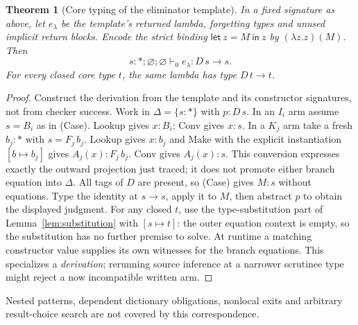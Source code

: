 \documentclass[11pt]{article}
\newtheorem{theorem}{Theorem}[section]
\theoremstyle{definition}
\newcommand{\arr}{\mathbin{\to}}
\begin{document}
\begin{theorem}[Core typing of the eliminator template]\label{thm:elim}
In a fixed signature as above, let $e_\lambda$ be the template's returned
lambda, forgetting types and unused implicit return blocks. Encode the
strict binding $\mathsf{let}\ z=M\ \mathsf{in}\ z$ by $(\lambda z.z)(M)$.
Then
\[
  s:*;\varnothing;\varnothing\vdash_0 e_\lambda:D\,s\arr s.
\]
For every closed core type $t$, the same lambda has type $D\,t\arr t$.
\end{theorem}
\begin{proof}
Construct the derivation from the template and its constructor signatures,
not from checker success. Work in $\Delta=\{s:*\}$ with $p:D\,s$. In an
$I_i$ arm assume $s=B_i$ as in (Case). Lookup gives $x:B_i$; \textsf{Conv}
gives $x:s$. In a $K_j$ arm take a fresh $b_j:*$ with $s=F_j\,b_j$.
Lookup gives $x:b_j$ and \textsf{Make} with the explicit instantiation
$[b\mapsto b_j]$ gives $A_j(x):F_j\,b_j$. \textsf{Conv} gives $A_j(x):s$.
This conversion expresses exactly the outward projection just traced;
it does not promote either branch equation into $\Delta$. All tags of
$D$ are present, so (Case) gives $M:s$ without equations. Type the identity
at $s\arr s$, apply it to $M$, then abstract $p$ to obtain the displayed
judgment. For any closed $t$, use the type-substitution part of
Lemma~\ref{lem:substitution} with $[s\mapsto t]$: the outer equation
context is empty, so the substitution has no further premise to solve.
At runtime a matching constructor value supplies its own witnesses for
the branch equations. This specializes a \emph{derivation}; rerunning
source inference at a narrower scrutinee type might reject a now
incompatible written arm.
\end{proof}
Nested patterns, dependent dictionary obligations, nonlocal exits and
arbitrary result-choice search are not covered by this correspondence.
\end{document}
